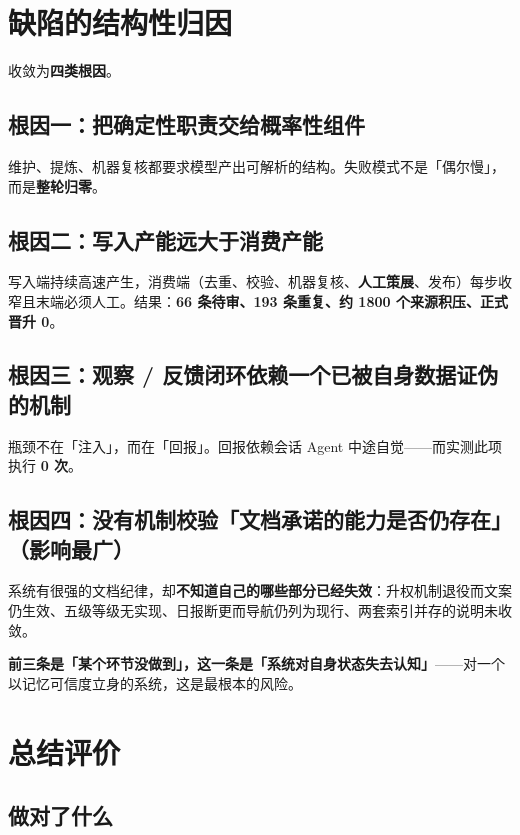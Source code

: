 \documentclass[11pt,a4paper]{ctexart}
\begin{document}
\section{缺陷的结构性归因}

收敛为\textbf{四类根因}。

\subsection*{根因一：把确定性职责交给概率性组件}

维护、提炼、机器复核都要求模型产出可解析的结构。失败模式不是「偶尔慢」，而是\textbf{整轮归零}。

\subsection*{根因二：写入产能远大于消费产能}

写入端持续高速产生，消费端（去重、校验、机器复核、\textbf{人工策展}、发布）每步收窄且末端必须人工。结果：\textbf{66 条待审、193 条重复、约 1800 个来源积压、正式晋升 0}。

\subsection*{根因三：观察 / 反馈闭环依赖一个已被自身数据证伪的机制}

瓶颈不在「注入」，而在「回报」。回报依赖会话 Agent 中途自觉——而实测此项执行 \textbf{0 次}。

\subsection*{根因四：没有机制校验「文档承诺的能力是否仍存在」（影响最广）}

系统有很强的文档纪律，却\textbf{不知道自己的哪些部分已经失效}：升权机制退役而文案仍生效、五级等级无实现、日报断更而导航仍列为现行、两套索引并存的说明未收敛。

\textbf{前三条是「某个环节没做到」，这一条是「系统对自身状态失去认知」}——对一个以记忆可信度立身的系统，这是最根本的风险。

\section{总结评价}

\subsection{做对了什么}
\end{document}
